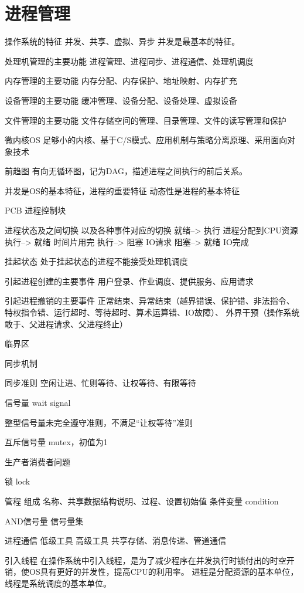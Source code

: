 \chapter{进程管理}

操作系统的特征
并发、共享、虚拟、异步
并发是最基本的特征。

处理机管理的主要功能
进程管理、进程同步、进程通信、处理机调度

内存管理的主要功能
内存分配、内存保护、地址映射、内存扩充

设备管理的主要功能
缓冲管理、设备分配、设备处理、虚拟设备

文件管理的主要功能
文件存储空间的管理、目录管理、文件的读写管理和保护

微内核OS
足够小的内核、基于C/S模式、应用机制与策略分离原理、采用面向对象技术

前趋图
有向无循环图，记为DAG，描述进程之间执行的前后关系。

并发是OS的基本特征，进程的重要特征
动态性是进程的基本特征

PCB 进程控制块

进程状态及之间切换
以及各种事件对应的切换
就绪--> 执行 进程分配到CPU资源
执行--> 就绪 时间片用完
执行--> 阻塞 IO请求
阻塞--> 就绪 IO完成

挂起状态
处于挂起状态的进程不能接受处理机调度

引起进程创建的主要事件
用户登录、作业调度、提供服务、应用请求

引起进程撤销的主要事件
正常结束、异常结束（越界错误、保护错、非法指令、
特权指令错、运行超时、等待超时、算术运算错、IO故障）、
外界干预（操作系统敢于、父进程请求、父进程终止）

临界区

同步机制

同步准则
空闲让进、忙则等待、让权等待、有限等待

信号量 wait signal

整型信号量未完全遵守准则，不满足“让权等待”准则

互斥信号量 mutex，初值为1 
 

生产者消费者问题

锁 lock

管程
组成 名称、共享数据结构说明、过程、设置初始值
条件变量 condition 

AND信号量
信号量集

进程通信
低级工具 
高级工具 共享存储、消息传递、管道通信


引入线程
在操作系统中引入线程，是为了减少程序在并发执行时锁付出的时空开销，使OS具有更好的并发性，提高CPU的利用率。
进程是分配资源的基本单位，线程是系统调度的基本单位。

